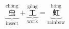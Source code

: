 \[ \underbrace{\overset{\text{chóng}}{\text{虫}}}_{\text{insect}} + \underbrace{\overset{\text{gōng}}{\text{工}}}_{\text{work}} = \underbrace{\overset{\text{hóng}}{\text{虹}}}_{\text{rainbow}} \]
